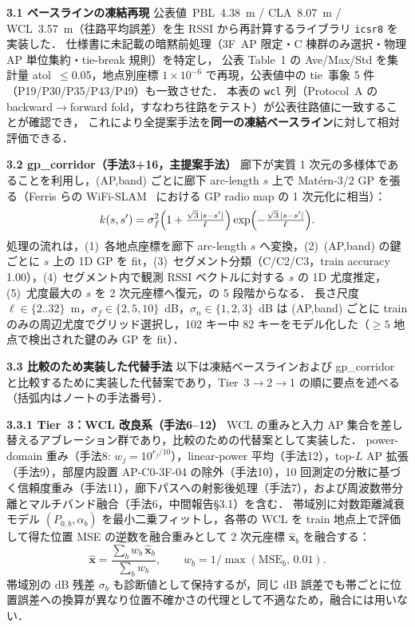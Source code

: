 \documentclass[a4paper,twocolumn]{ltjsarticle}
\begin{document}
\smallskip\noindent\textbf{3.1\; ベースラインの凍結再現}\;
公表値~\cite{tanaka2023tut}\;PBL~4.38~m / CLA~8.07~m / WCL~3.57~m（往路平均誤差）を生 RSSI から再計算するライブラリ \texttt{icsr8} を実装した．
仕様書に未記載の暗黙前処理（3F~AP 限定・C 棟群のみ選択・物理 AP 単位集約・tie-break 規則）を特定し，
公表 Table~1 の Ave/Max/Std を集計量 atol~$\leq$0.05，地点別座標 $1\times10^{-6}$ で再現，公表値中の tie~事象 5 件（P19/P30/P35/P43/P49）も一致させた．
本表の \texttt{wcl} 列（Protocol~A の backward$\to$forward fold，すなわち往路をテスト）が公表往路値に一致することが確認でき，
これにより全提案手法を\textbf{同一の凍結ベースライン}に対して相対評価できる．

\smallskip\noindent\textbf{3.2\; gp\_corridor（手法3+16，主提案手法）}\;
廊下が実質 1 次元の多様体であることを利用し，(AP,band) ごとに廊下 arc-length $s$ 上で Matérn-3/2 GP を張る（Ferris らの WiFi-SLAM~\cite{ferris2007gpslam} における GP radio map の 1 次元化に相当）：
\[
  k(s,s')=\sigma_f^2\Bigl(1+\tfrac{\sqrt{3}\,|s-s'|}{\ell}\Bigr)\exp\Bigl(-\tfrac{\sqrt{3}\,|s-s'|}{\ell}\Bigr).
\]
処理の流れは，(1)~各地点座標を廊下 arc-length $s$ へ変換，(2)~(AP,band) の鍵ごとに $s$ 上の 1D GP を fit，(3)~セグメント分類（C/C2/C3，train accuracy 1.00），(4)~セグメント内で観測 RSSI ベクトルに対する $s$ の 1D 尤度推定，(5)~尤度最大の $s$ を 2 次元座標へ復元，の 5 段階からなる．
長さ尺度 $\ell\in\{2..32\}$~m，$\sigma_f\in\{2,5,10\}$~dB，$\sigma_n\in\{1,2,3\}$~dB は (AP,band) ごとに train のみの周辺尤度でグリッド選択し，102 キー中 82 キーをモデル化した（$\geq 5$ 地点で検出された鍵のみ GP を fit）．

\smallskip\noindent\textbf{3.3\; 比較のため実装した代替手法}\;
以下は凍結ベースラインおよび gp\_corridor と比較するために実装した代替案であり，Tier~3$\to$2$\to$1 の順に要点を述べる（括弧内はノートの手法番号）．

\smallskip\noindent\textbf{3.3.1\; Tier~3：WCL 改良系（手法6--12）}\;
WCL の重みと入力 AP 集合を差し替えるアブレーション群であり，比較のための代替案として実装した．
power-domain 重み（手法8: $w_j=10^{r_j/10}$），linear-power 平均（手法12），top-$L$ AP 拡張（手法9），部屋内設置 AP-C0-3F-04 の除外（手法10），10 回測定の分散に基づく信頼度重み（手法11），廊下パスへの射影後処理（手法7），および周波数帯分離とマルチバンド融合（手法6，中間報告§3.1）を含む．
帯域別に対数距離減衰モデル $(P_{0,b},\alpha_b)$ を最小二乗フィットし，各帯の WCL を train 地点上で評価して得た位置 MSE の逆数を融合重みとして 2 次元座標 $\hat{\mathbf{x}}_b$ を融合する：
\[
  \hat{\mathbf{x}}=\frac{\sum_b w_b\,\hat{\mathbf{x}}_b}{\sum_b w_b},\qquad w_b=1/\max(\mathrm{MSE}_b,\,0.01).
\]
帯域別の dB 残差 $\sigma_b$ も診断値として保持するが，同じ dB 誤差でも帯ごとに位置誤差への換算が異なり位置不確かさの代理として不適なため，融合には用いない．
\end{document}
